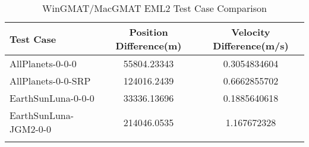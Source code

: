 \begin{table}[htbp!]
\centering
\caption{ WinGMAT/MacGMAT EML2 Test Case Comparison}
      \begin{tabular}{lcc}
      \hline\hline
          Test Case & Position Difference(m) & Velocity Difference(m/s) \\
         \hline
         AllPlanets-0-0-0 & 55804.23343 & 0.3054834604 \\
         AllPlanets-0-0-SRP & 124016.2439 & 0.6662855702 \\
         EarthSunLuna-0-0-0 & 33336.13696 & 0.1885640618 \\
         EarthSunLuna-JGM2-0-0 & 214046.0535 & 1.167672328 \\
      \hline\hline
      \label{Table: EML2 WinGMAT-MacGMAT Table} 
\end{tabular}
\end{table}
